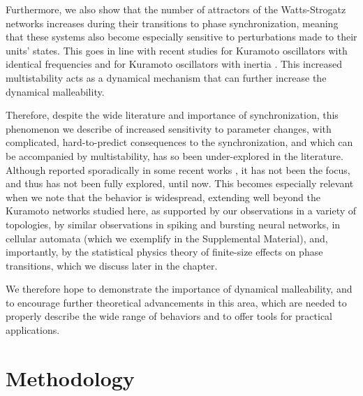 Furthermore, we also show that the number of attractors of the Watts-Strogatz networks increases during their transitions to phase synchronization, meaning that these systems also become especially sensitive to perturbations made to their units' states. This goes in line with recent studies for Kuramoto oscillators with identical frequencies \cite{taylor2012there, zhang2021basins, townsend2020dense} and for Kuramoto oscillators with inertia \cite{gelbrecht2020monte}. This increased multistability acts as a dynamical mechanism that can further increase the dynamical malleability. 

Therefore, despite the wide literature and importance of synchronization, this phenomenon we describe of increased sensitivity to parameter changes, with complicated, hard-to-predict consequences to the synchronization, and which can be accompanied by multistability, has so been under-explored in the literature. Although reported sporadically in some recent works \cite{peter2018transition, taylor2016synchronization, fernandez2022emergence, budzinski2019synchronous}, it has not been the focus, and thus has not been fully explored, until now. This becomes especially relevant when we note that the behavior is widespread, extending well beyond the Kuramoto networks studied here, as supported by our observations in a variety of topologies, by similar observations in spiking \cite{budzinski2020synchronization} and bursting \cite{budzinski2019synchronous} neural networks, in cellular automata (which we exemplify in the Supplemental Material), and, importantly, by the statistical physics theory of finite-size effects on phase transitions, which we discuss later in the chapter. 

We therefore hope to demonstrate the importance of dynamical malleability, and to encourage further theoretical advancements in this area, which are needed to properly describe the wide range of behaviors and to offer tools for practical applications.  

\section{Methodology}\label{sec:methodology}

